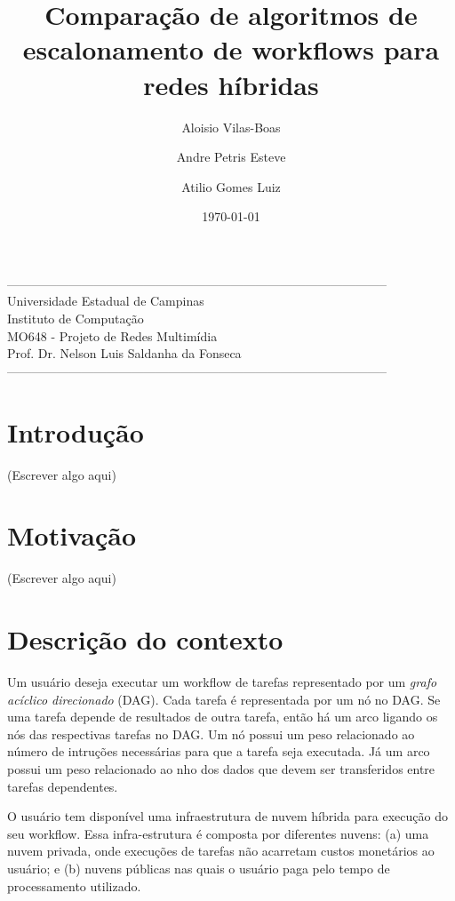 \documentclass[a4paper,10pt]{article}
\title{Comparação de algoritmos de escalonamento de workflows para redes híbridas}
\author{Aloisio Vilas-Boas\and Andre Petris Esteve\and Atilio Gomes Luiz}
\date{\today}
\begin{document}
\maketitle

\begin{center}
--------------------------------------------------------------------------------------------\\
Universidade Estadual de Campinas\\
Instituto de Computação\\
MO648 - Projeto de Redes Multimídia\\
Prof. Dr. Nelson Luis Saldanha da Fonseca\\
--------------------------------------------------------------------------------------------\\
\end{center}

\section{Introdução}

(Escrever algo aqui)

\section{Motivação}

(Escrever algo aqui)

\section{Descrição do contexto}

Um usuário deseja executar um workflow de tarefas representado por um \emph{grafo acíclico 
direcionado} (DAG). Cada tarefa é representada por um nó no DAG. Se uma tarefa depende de
resultados de outra tarefa, então há um arco ligando os nós das respectivas tarefas no DAG.
Um nó possui um peso relacionado ao número de intruções necessárias para que a tarefa seja executada.
Já um arco possui um peso relacionado ao nho dos dados que devem ser transferidos entre tarefas
dependentes.

O usuário tem disponível uma infraestrutura de nuvem híbrida para execução do 
seu workflow. Essa infra-estrutura é composta por diferentes nuvens: (a) uma nuvem 
privada, onde execuções de tarefas não acarretam custos monetários ao usuário; e (b) 
nuvens públicas nas quais o usuário paga pelo tempo de processamento utilizado.
\end{document}

